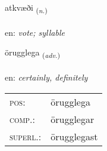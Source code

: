\documentclass[frontgrid, backgrid]{flacards}\usepackage[]{graphicx}\usepackage[]{color}
\begin{document}
\renewcommand{\flhead}{\vskip5pt \fboxsep=0pt {\small\bfseries\footnotesize Nafnorð | Noun}}
\renewcommand{\fcfoot}{\vskip5pt \fboxsep=0pt \hspace{2pt}{\small\bfseries\footnotesize 2K}}

\renewcommand{\blhead}{\vskip5pt {\small\bfseries\footnotesize Nafnorð | Noun }}
\renewcommand{\bcfoot}{\vskip5pt \hspace{2pt}{\small\bfseries\footnotesize 2K}}


{atkvæði \small{\textsubscript{(\textit{n.})}} \\[1ex] %
\textphonetic{[aːtkʰvaiðɪ]} \\
en: \emph{vote; syllable} \\  [2ex]
\renewcommand*{\arraystretch}{0.8}
}

\renewcommand{\flhead}{\vskip5pt \fboxsep=0pt {\small\bfseries\footnotesize Atviksorð | Adverb}}
\renewcommand{\fcfoot}{\vskip5pt \fboxsep=0pt \hspace{2pt}{\small\bfseries\footnotesize 2K}}

\renewcommand{\blhead}{\vskip5pt {\small\bfseries\footnotesize Atviksorð | Adverb }}
\renewcommand{\bcfoot}{\vskip5pt \hspace{2pt}{\small\bfseries\footnotesize 2K}}


{örugglega \small{\textsubscript{(\textit{adv.})}} \\[1ex] %
\textphonetic{[œːrʏklɛɣa]} \\
en: \emph{certainly, definitely} \\  [2ex]
\renewcommand*{\arraystretch}{0.8}
\begin{tabular}{ll}
\textsc{pos}: & örugglega \\ 
\textsc{comp.}: & örugglegar \\ 
\textsc{superl.}: & örugglegast \\
\end{tabular}
}
\end{document}
